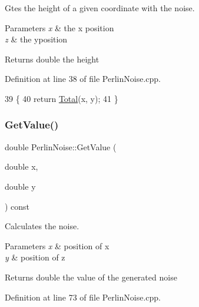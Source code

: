 Gtes the height of a given coordinate with the noise. 


\begin{DoxyParams}{Parameters}
{\em x} & the x position \\
\hline
{\em z} & the yposition \\
\hline
\end{DoxyParams}
\begin{DoxyReturn}{Returns}
double the height 
\end{DoxyReturn}


Definition at line 38 of file Perlin\+Noise.\+cpp.


\begin{DoxyCode}
39 \{
40     \textcolor{keywordflow}{return} \mbox{\hyperlink{class_perlin_noise_a63d0a127952107e5628c428c8a234de8}{Total}}(x, y);
41 \}
\end{DoxyCode}
\mbox{\label{class_perlin_noise_aa62e61ba1a73bdeff0901e95f656a806}} 
\subsubsection{\texorpdfstring{Get\+Value()}{GetValue()}}
{\footnotesize\ttfamily double Perlin\+Noise\+::\+Get\+Value (\begin{DoxyParamCaption}\item[{double}]{x,  }\item[{double}]{y }\end{DoxyParamCaption}) const\hspace{0.3cm}{\ttfamily [private]}}



Calculates the noise. 


\begin{DoxyParams}{Parameters}
{\em x} & position of x \\
\hline
{\em y} & position of z \\
\hline
\end{DoxyParams}
\begin{DoxyReturn}{Returns}
double the value of the generated noise 
\end{DoxyReturn}


Definition at line 73 of file Perlin\+Noise.\+cpp.


